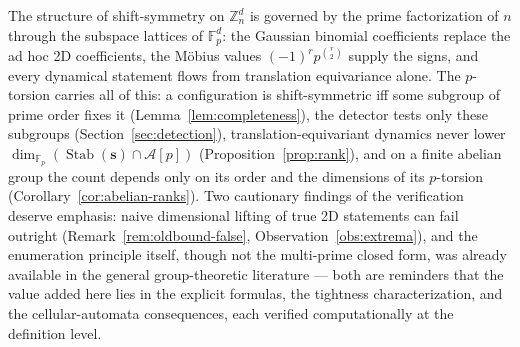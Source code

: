 \documentclass[11pt,a4paper]{article}
\theoremstyle{remark}
\DeclareMathOperator{\Stab}{Stab}
\newcommand{\ZZ}{\mathbb{Z}}
\newcommand{\FF}{\mathbb{F}}
\newcommand{\A}{\mathcal{A}}
\newcommand{\ssb}{\mathbf{s}}
\begin{document}
The structure of shift-symmetry on $\ZZ_n^d$ is governed by the prime
factorization of $n$ through the subspace lattices of $\FF_p^d$: the
Gaussian binomial coefficients replace the ad hoc 2D coefficients, the
M\"obius values $(-1)^rp^{\binom r2}$ supply the signs, and every
dynamical statement flows from translation equivariance alone.
The $p$-torsion carries all of this: a configuration is shift-symmetric iff
some subgroup of prime order fixes it (Lemma~\ref{lem:completeness}), the
detector tests only these subgroups (Section~\ref{sec:detection}),
translation-equivariant dynamics never lower $\dim_{\FF_p}(\Stab(\ssb)\cap\A[p])$
(Proposition~\ref{prop:rank}), and on a finite abelian group the count depends only on
its order and the dimensions of its $p$-torsion (Corollary~\ref{cor:abelian-ranks}). Two
cautionary findings of the verification deserve
emphasis: naive dimensional lifting of true 2D statements can fail
outright (Remark~\ref{rem:oldbound-false},
Observation~\ref{obs:extrema}), and the enumeration principle itself,
though not the multi-prime closed form, was already available in the general
group-theoretic literature \cite{cg2017} --- both are reminders that the
value added here lies in the explicit formulas, the tightness
characterization, and the cellular-automata consequences, each verified
computationally at the definition level.
\end{document}
